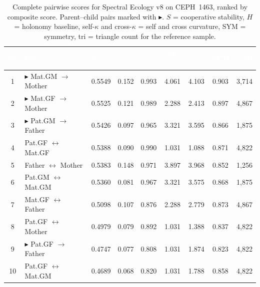 \documentclass{../yalumba}
\begin{document}
\begin{table}[H]
  \centering
  \tablestyle
  \caption{Complete pairwise scores for Spectral Ecology v8 on CEPH~1463,
    ranked by composite score.  Parent--child pairs marked with
    $\blacktriangleright$.  $S$ = cooperative stability, $H$ = holonomy
    baseline, self-$\kappa$ and cross-$\kappa$ = self and cross curvature,
    SYM = symmetry, tri = triangle count for the reference sample.}
  \label{tab:scores}
  \begin{tabular}{clccccccr}
    \toprule
    \rowcolor{table-header}
    \textcolor{white}{\textbf{Rk}} &
    \textcolor{white}{\textbf{Pair}} &
    \textcolor{white}{\textbf{Score}} &
    \textcolor{white}{\textbf{$S$}} &
    \textcolor{white}{\textbf{$H$}} &
    \textcolor{white}{\textbf{self-$\kappa$}} &
    \textcolor{white}{\textbf{x-$\kappa$}} &
    \textcolor{white}{\textbf{SYM}} &
    \textcolor{white}{\textbf{tri}} \\
    \midrule
    1 & $\blacktriangleright$ Mat.GM $\to$ Mother
      & 0.5549 & 0.152 & 0.993 & 4.061 & 4.103 & 0.903 & 3{,}714 \\
    2 & $\blacktriangleright$ Mat.GF $\to$ Mother
      & 0.5525 & 0.121 & 0.989 & 2.288 & 2.413 & 0.897 & 4{,}867 \\
    3 & $\blacktriangleright$ Pat.GM $\to$ Father
      & 0.5426 & 0.097 & 0.965 & 3.321 & 3.595 & 0.866 & 1{,}875 \\
    \midrule
    4 & Pat.GF $\leftrightarrow$ Mat.GF
      & 0.5388 & 0.090 & 0.990 & 1.031 & 1.088 & 0.871 & 4{,}822 \\
    5 & Father $\leftrightarrow$ Mother
      & 0.5383 & 0.148 & 0.971 & 3.897 & 3.968 & 0.852 & 1{,}256 \\
    6 & Pat.GM $\leftrightarrow$ Mat.GM
      & 0.5360 & 0.081 & 0.967 & 3.321 & 3.575 & 0.868 & 1{,}875 \\
    7 & Mat.GF $\leftrightarrow$ Father
      & 0.5098 & 0.107 & 0.876 & 2.288 & 2.779 & 0.873 & 4{,}867 \\
    8 & Pat.GF $\leftrightarrow$ Mother
      & 0.4979 & 0.079 & 0.892 & 1.031 & 1.388 & 0.837 & 4{,}822 \\
    \midrule
    9 & $\blacktriangleright$ Pat.GF $\to$ Father
      & 0.4747 & 0.077 & 0.808 & 1.031 & 1.874 & 0.823 & 4{,}822 \\
    10 & Pat.GF $\leftrightarrow$ Mat.GM
       & 0.4689 & 0.068 & 0.820 & 1.031 & 1.788 & 0.858 & 4{,}822 \\
    \bottomrule
  \end{tabular}
\end{table}
\end{document}

